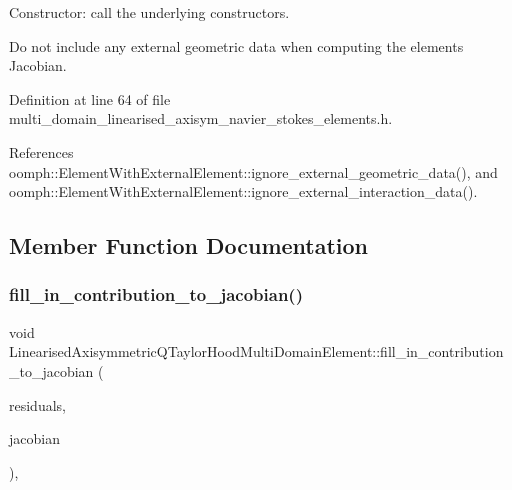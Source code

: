 Constructor\+: call the underlying constructors. 

Do not include any external geometric data when computing the element\textquotesingle{}s Jacobian. 

Definition at line 64 of file multi\+\_\+domain\+\_\+linearised\+\_\+axisym\+\_\+navier\+\_\+stokes\+\_\+elements.\+h.



References oomph\+::\+Element\+With\+External\+Element\+::ignore\+\_\+external\+\_\+geometric\+\_\+data(), and oomph\+::\+Element\+With\+External\+Element\+::ignore\+\_\+external\+\_\+interaction\+\_\+data().



\subsection{Member Function Documentation}
\mbox{\label{classLinearisedAxisymmetricQTaylorHoodMultiDomainElement_adc20fbe7a713cb4b1d80c750698416ed}} 
\subsubsection{\texorpdfstring{fill\+\_\+in\+\_\+contribution\+\_\+to\+\_\+jacobian()}{fill\_in\_contribution\_to\_jacobian()}}
{\footnotesize\ttfamily void Linearised\+Axisymmetric\+Q\+Taylor\+Hood\+Multi\+Domain\+Element\+::fill\+\_\+in\+\_\+contribution\+\_\+to\+\_\+jacobian (\begin{DoxyParamCaption}\item[{\hyperlink{classoomph_1_1Vector}{Vector}$<$ double $>$ \&}]{residuals,  }\item[{\hyperlink{classoomph_1_1DenseMatrix}{Dense\+Matrix}$<$ double $>$ \&}]{jacobian }\end{DoxyParamCaption})\hspace{0.3cm}{\ttfamily [inline]}, {\ttfamily [virtual]}}



